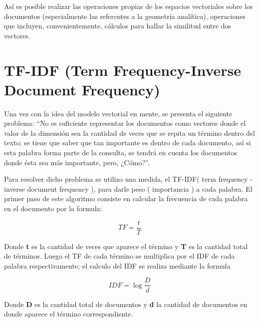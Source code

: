 \documentclass[10pt]{article}
\begin{document}
Así es posible realizar las operaciones propias de los espacios vectoriales sobre los documentos (especialmente las referentes a la geometría analítica), operaciones que incluyen, convenientemente, cálculos para hallar la similitud entre dos vectores.

\clearpage
\section{TF-IDF (Term Frequency-Inverse Document Frequency)}
\label{sec:tf-idf}

Una vez con la idea del modelo vectorial en mente, se presenta el siguiente problema: “No es suficiente representar los documentos como vectores donde el valor de la dimensión sea la cantidad de veces que se repita un término dentro del texto; se tiene que saber que tan importante es dentro de cada documento, así si esta palabra forma parte de la consulta, se tendrá en cuenta los documentos donde ésta sea más importante, pero, ¿Cómo?”.

\vspace*{.2cm}

Para resolver dicho problema se utilizo una medida, el TF-IDF( term frequency - inverse document frequency ), para darle peso ( importancia ) a cada palabra. El primer paso de este algoritmo consiste en calcular la frecuencia de cada palabra en el documento por la formula:

\Huge
\begin{equation*}		
	TF = \frac{t}{T}
\end{equation*}
\normalsize

\vspace{1cm}

Donde \large\textbf{t}\normalsize\hspace{1pt} es la cantidad de veces que aparece el término y \large\textbf{T}\normalsize\hspace{1pt} es la cantidad total de términos. Luego el TF de cada término se multiplica por el IDF de cada palabra respectivamente; el calculo del IDF se realiza mediante la formula

\Huge
\begin{equation*}		
	IDF = \log{\frac{D}{d}}
\end{equation*}
\normalsize

\vspace{1cm}

Donde \large\textbf{D}\normalsize\hspace{1pt} es la cantidad total de documentos y \large\textbf{d}\normalsize\hspace{1pt} la cantidad de documentos en donde aparece el término correspondiente.
\end{document}
